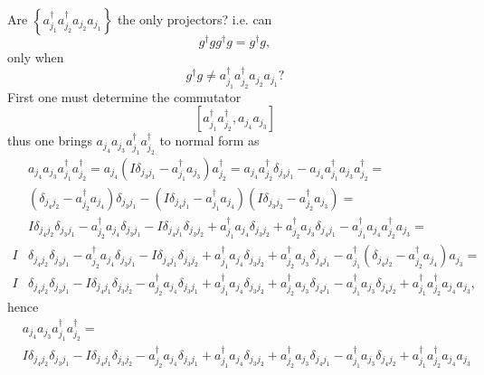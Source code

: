 \documentclass[aps,preprint]{revtex4}%
\begin{document}
Are $\left\{  a_{j_{1}}^{\dagger}a_{j_{2}}^{\dagger}a_{j_{2}}a_{j_{1}%
}\right\}  $ the only projectors? i.e. can
\begin{equation}
g^{\dagger}gg^{\dagger}g=g^{\dagger}g,
\end{equation}
only when
\begin{equation}
g^{\dagger}g\neq a_{j_{1}}^{\dagger}a_{j_{2}}^{\dagger}a_{j_{2}}a_{j_{1}}?
\end{equation}
First one must determine the commutator%
\begin{equation}
\left[  a_{j_{1}}^{\dagger}a_{j_{2}}^{\dagger},a_{j_{4}}a_{j_{3}}\right]
\end{equation}
thus one brings $a_{j_{4}}a_{j_{3}}a_{j_{1}}^{\dagger}a_{j_{2}}^{\dagger}$ to
normal form as
\begin{align}
&  a_{j_{4}}a_{j_{3}}a_{j_{1}}^{\dagger}a_{j_{2}}^{\dagger}=a_{j_{4}}\left(
I\delta_{j_{3}j_{1}}-a_{j_{1}}^{\dagger}a_{j_{3}}\right)  a_{j_{2}}^{\dagger
}=a_{j_{4}}a_{j_{2}}^{\dagger}\delta_{j_{3}j_{1}}-a_{j_{4}}a_{j_{1}}^{\dagger
}a_{j_{3}}a_{j_{2}}^{\dagger}=\nonumber\\
&  \left(  \delta_{j_{4}j_{2}}-a_{j_{2}}^{\dagger}a_{j_{4}}\right)
\delta_{j_{3}j_{1}}-\left(  I\delta_{j_{4}j_{1}}-a_{j_{1}}^{\dagger}a_{j_{4}%
}\right)  \left(  I\delta_{j_{3}j_{2}}-a_{j_{2}}^{\dagger}a_{j_{3}}\right)
=\nonumber\\
&  I\delta_{j_{4}j_{2}}\delta_{j_{3}j_{1}}-a_{j_{2}}^{\dagger}a_{j_{4}}%
\delta_{j_{3}j_{1}}-I\delta_{j_{4}j_{1}}\delta_{j_{3}j_{2}}+a_{j_{1}}%
^{\dagger}a_{j_{4}}\delta_{j_{3}j_{2}}+a_{j_{2}}^{\dagger}a_{j_{3}}%
\delta_{j_{4}j_{1}}-a_{j_{1}}^{\dagger}a_{j_{4}}a_{j_{2}}^{\dagger}a_{j_{3}%
}=\nonumber\\
I  &  \delta_{j_{4}j_{2}}\delta_{j_{3}j_{1}}-a_{j_{2}}^{\dagger}a_{j_{4}%
}\delta_{j_{3}j_{1}}-I\delta_{j_{4}j_{1}}\delta_{j_{3}j_{2}}+a_{j_{1}%
}^{\dagger}a_{j_{4}}\delta_{j_{3}j_{2}}+a_{j_{2}}^{\dagger}a_{j_{3}}%
\delta_{j_{4}j_{1}}-a_{j_{1}}^{\dagger}\left(  \delta_{j_{4}j_{2}}-a_{j_{2}%
}^{\dagger}a_{j_{4}}\right)  a_{j_{3}}=\nonumber\\
I  &  \delta_{j_{4}j_{2}}\delta_{j_{3}j_{1}}-I\delta_{j_{4}j_{1}}\delta
_{j_{3}j_{2}}-a_{j_{2}}^{\dagger}a_{j_{4}}\delta_{j_{3}j_{1}}+a_{j_{1}%
}^{\dagger}a_{j_{4}}\delta_{j_{3}j_{2}}+a_{j_{2}}^{\dagger}a_{j_{3}}%
\delta_{j_{4}j_{1}}-a_{j_{1}}^{\dagger}a_{j_{3}}\delta_{j_{4}j_{2}}+a_{j_{1}%
}^{\dagger}a_{j_{2}}^{\dagger}a_{j_{4}}a_{j_{3}},
\end{align}
hence
\begin{align}
&  a_{j_{4}}a_{j_{3}}a_{j_{1}}^{\dagger}a_{j_{2}}^{\dagger}=\nonumber\\
&  I\delta_{j_{4}j_{2}}\delta_{j_{3}j_{1}}-I\delta_{j_{4}j_{1}}\delta
_{j_{3}j_{2}}-a_{j_{2}}^{\dagger}a_{j_{4}}\delta_{j_{3}j_{1}}+a_{j_{1}%
}^{\dagger}a_{j_{4}}\delta_{j_{3}j_{2}}+a_{j_{2}}^{\dagger}a_{j_{3}}%
\delta_{j_{4}j_{1}}-a_{j_{1}}^{\dagger}a_{j_{3}}\delta_{j_{4}j_{2}}+a_{j_{1}%
}^{\dagger}a_{j_{2}}^{\dagger}a_{j_{4}}a_{j_{3}}%
\end{align}
\end{document}
